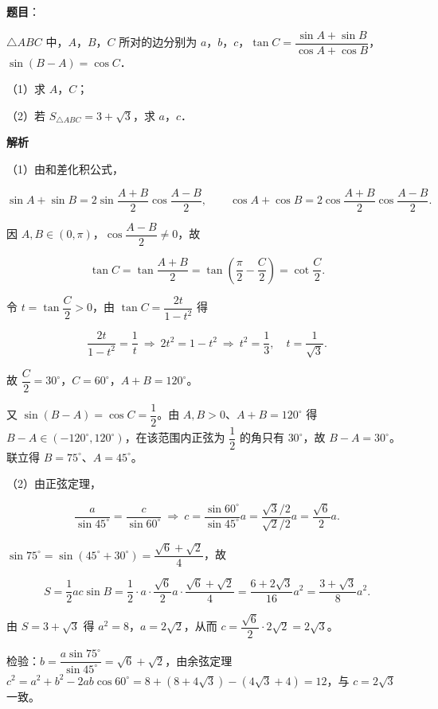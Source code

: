 \begin{answer}

\textbf{题目}：

$\triangle ABC$ 中，$A$，$B$，$C$ 所对的边分别为 $a$，$b$，$c$，$\tan C=\dfrac{\sin A+\sin B}{\cos A+\cos B}$，$\sin(B-A)=\cos C$．

（1）求 $A$，$C$；

（2）若 $S_{\triangle ABC}=3+\sqrt3$，求 $a$，$c$．

\textbf{解析}

（1）由和差化积公式，

\nopagebreak[4]
\[\sin A+\sin B=2\sin\frac{A+B}{2}\cos\frac{A-B}{2},\qquad \cos A+\cos B=2\cos\frac{A+B}{2}\cos\frac{A-B}{2}.\]

因 $A,B\in(0,\pi)$，$\cos\dfrac{A-B}{2}\neq0$，故

\nopagebreak[4]
\[\tan C=\tan\frac{A+B}{2}=\tan\left(\frac{\pi}{2}-\frac C2\right)=\cot\frac C2.\]

令 $t=\tan\dfrac C2>0$，由 $\tan C=\dfrac{2t}{1-t^2}$ 得

\nopagebreak[4]
\[\frac{2t}{1-t^2}=\frac1t\ \Longrightarrow\ 2t^2=1-t^2\ \Longrightarrow\ t^2=\frac13,\quad t=\frac1{\sqrt3}.\]

故 $\dfrac C2=30^\circ$，$C=60^\circ$，$A+B=120^\circ$。

又 $\sin(B-A)=\cos C=\dfrac12$。由 $A,B>0$、$A+B=120^\circ$ 得 $B-A\in(-120^\circ,120^\circ)$，在该范围内正弦为 $\dfrac12$ 的角只有 $30^\circ$，故 $B-A=30^\circ$。联立得 $B=75^\circ$、$A=45^\circ$。

（2）由正弦定理，

\nopagebreak[4]
\[\frac{a}{\sin45^\circ}=\frac{c}{\sin60^\circ}\ \Longrightarrow\ c=\frac{\sin60^\circ}{\sin45^\circ}a=\frac{\sqrt3/2}{\sqrt2/2}a=\frac{\sqrt6}{2}a.\]

$\sin75^\circ=\sin(45^\circ+30^\circ)=\dfrac{\sqrt6+\sqrt2}{4}$，故

\nopagebreak[4]
\[S=\frac12ac\sin B=\frac12\cdot a\cdot\frac{\sqrt6}{2}a\cdot\frac{\sqrt6+\sqrt2}{4}=\frac{6+2\sqrt3}{16}a^2=\frac{3+\sqrt3}{8}a^2.\]

由 $S=3+\sqrt3$ 得 $a^2=8$，$a=2\sqrt2$，从而 $c=\dfrac{\sqrt6}{2}\cdot2\sqrt2=2\sqrt3$。

检验：$b=\dfrac{a\sin75^\circ}{\sin45^\circ}=\sqrt6+\sqrt2$，由余弦定理 $c^2=a^2+b^2-2ab\cos60^\circ=8+(8+4\sqrt3)-(4\sqrt3+4)=12$，与 $c=2\sqrt3$ 一致。


\end{answer}

